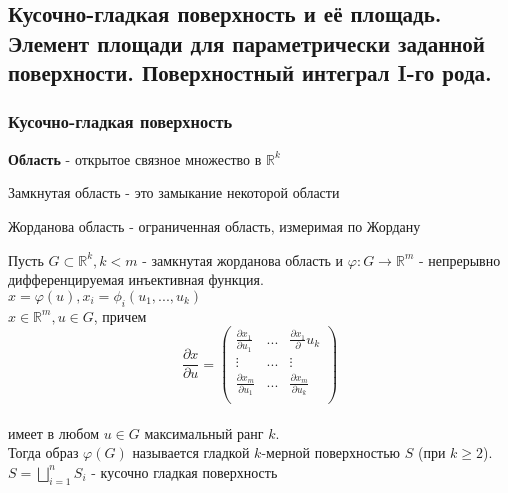 \subsection{Кусочно-гладкая поверхность и её площадь. Элемент площади для параметрически заданной поверхности. Поверхностный интеграл I-го рода.}
\subsubsection{Кусочно-гладкая поверхность}
    \begin{definition*}
        \textbf{Область} - открытое связное множество в $\mathbb{R}^k$\\
    \end{definition*}
    \begin{definition*}
        Замкнутая область - это замыкание некоторой области\\
    \end{definition*}
    \begin{definition*}
        Жорданова область - ограниченная область, измеримая по Жордану\\
    \end{definition*}
    \begin{definition*}
        Пусть $G \subset \mathbb{R}^k, k<m$ - замкнутая жорданова область и $\varphi: G \rightarrow \mathbb{R}^m$ - непрерывно дифференцируемая инъективная функция.\\
        $x= \varphi(u), x_i = \phi_i(u_1, ..., u_k)$\\
        $x \in \mathbb{R}^m, u \in G$, причем \\
        $$\frac{\partial x}{\partial u} = 
        \begin{pmatrix}
        \frac{\partial x_1}{\partial u_1} & ... & \frac{\partial x_1}{\partial }u_k \\
        \vdots & ... & \vdots \\
        \frac{\partial x_m}{\partial u_1} & ... & \frac{\partial x_m}{\partial u_k} \\
        \end{pmatrix}$$\\
        имеет в любом $u \in G$ максимальный ранг $k$.\\
        Тогда образ $\varphi(G)$ называется гладкой $k$-мерной поверхностью $S$ (при $k \geq 2$).\\
        $S = \bigsqcup_{i=1}^{n} S_i$ - кусочно гладкая поверхность\\
    \end{definition*}
